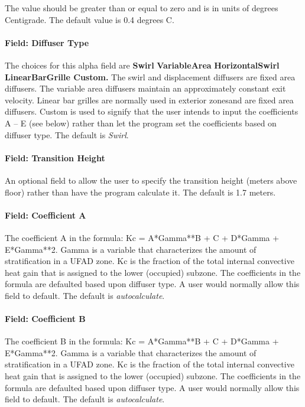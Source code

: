 The value should be greater than or equal to zero and is in units of degrees Centigrade. The default value is 0.4 degrees C.

\paragraph{Field: Diffuser Type}\label{field-diffuser-type-1}

The choices for this alpha field are \textbf{Swirl} \textbar{} \textbf{VariableArea} \textbar{} \textbf{HorizontalSwirl \textbar{} LinearBarGrille \textbar{} Custom.} The swirl and displacement diffusers are fixed area diffusers. The variable area diffusers maintain an approximately constant exit velocity. Linear bar grilles are normally used in exterior zonesand are fixed area diffusers. Custom is used to signify that the user intends to input the coefficients A -- E (see below) rather than let the program set the coefficients based on diffuser type. The default is \emph{Swirl}.

\paragraph{Field: Transition Height}\label{field-transition-height-1}

An optional field to allow the user to specify the transition height (meters above floor) rather than have the program calculate it. The default is 1.7 meters.

\paragraph{Field: Coefficient A}\label{field-coefficient-a-1}

The coefficient A in the formula: Kc = A*Gamma**B + C + D*Gamma + E*Gamma**2. Gamma is a variable that characterizes the amount of stratification in a UFAD zone. Kc is the fraction of the total internal convective heat gain that is assigned to the lower (occupied) subzone. The coefficients in the formula are defaulted based upon diffuser type. A user would normally allow this field to default. The default is \emph{autocalculate}.

\paragraph{Field: Coefficient B}\label{field-coefficient-b-1}

The coefficient B in the formula: Kc = A*Gamma**B + C + D*Gamma + E*Gamma**2. Gamma is a variable that characterizes the amount of stratification in a UFAD zone. Kc is the fraction of the total internal convective heat gain that is assigned to the lower (occupied) subzone. The coefficients in the formula are defaulted based upon diffuser type. A user would normally allow this field to default. The default is \emph{autocalculate}.

